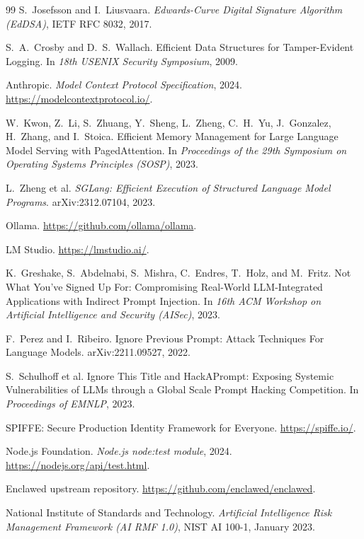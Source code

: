 \documentclass[11pt]{article}
\begin{document}
\begin{thebibliography}{99}
S.~Josefsson and I.~Liusvaara.
\emph{Edwards-Curve Digital Signature Algorithm (EdDSA)}, IETF RFC
8032, 2017.

S.~A.~Crosby and D.~S.~Wallach.
Efficient Data Structures for Tamper-Evident Logging.
In \emph{18th USENIX Security Symposium}, 2009.

Anthropic.
\emph{Model Context Protocol Specification}, 2024.
\url{https://modelcontextprotocol.io/}.

W.~Kwon, Z.~Li, S.~Zhuang, Y.~Sheng, L.~Zheng, C.~H.~Yu, J.~Gonzalez,
H.~Zhang, and I.~Stoica.
Efficient Memory Management for Large Language Model Serving with
PagedAttention.
In \emph{Proceedings of the 29th Symposium on Operating Systems
Principles (SOSP)}, 2023.

L.~Zheng et al.
\emph{SGLang: Efficient Execution of Structured Language Model Programs}.
arXiv:2312.07104, 2023.

Ollama. \url{https://github.com/ollama/ollama}.

LM Studio. \url{https://lmstudio.ai/}.

K.~Greshake, S.~Abdelnabi, S.~Mishra, C.~Endres, T.~Holz, and M.~Fritz.
Not What You've Signed Up For: Compromising Real-World LLM-Integrated
Applications with Indirect Prompt Injection.
In \emph{16th ACM Workshop on Artificial Intelligence and Security
(AISec)}, 2023.

F.~Perez and I.~Ribeiro.
Ignore Previous Prompt: Attack Techniques For Language Models.
arXiv:2211.09527, 2022.

S.~Schulhoff et al.
Ignore This Title and HackAPrompt: Exposing Systemic Vulnerabilities
of LLMs through a Global Scale Prompt Hacking Competition.
In \emph{Proceedings of EMNLP}, 2023.

SPIFFE: Secure Production Identity Framework for Everyone.
\url{https://spiffe.io/}.

Node.js Foundation.
\emph{Node.js node:test module}, 2024.
\url{https://nodejs.org/api/test.html}.

Enclawed upstream repository.
\url{https://github.com/enclawed/enclawed}.

National Institute of Standards and Technology.
\emph{Artificial Intelligence Risk Management Framework (AI RMF 1.0)},
NIST AI 100-1, January 2023.


\end{thebibliography}
\end{document}
